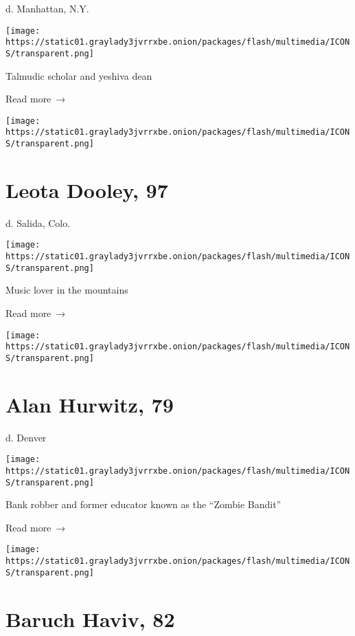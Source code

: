 d. Manhattan, N.Y.

\texttt{[image: https://static01.graylady3jvrrxbe.onion/packages/flash/multimedia/ICONS/transparent.png]}

Talmudic scholar and yeshiva dean

 Read more~→

\href{https://www.nytimes3xbfgragh.onion/2020/06/16/obituaries/leota-dooley-dead-coronavirus.html}{}

\texttt{[image: https://static01.graylady3jvrrxbe.onion/packages/flash/multimedia/ICONS/transparent.png]}

\hypertarget{leota-dooley-97}{%
\section{Leota Dooley, 97}\label{leota-dooley-97}}

d. Salida, Colo.

\texttt{[image: https://static01.graylady3jvrrxbe.onion/packages/flash/multimedia/ICONS/transparent.png]}

Music lover in the mountains

 Read more~→

\href{https://www.nytimes3xbfgragh.onion/2020/06/15/obituaries/alan-hurwitz-dead-coronavirus.html}{}

\texttt{[image: https://static01.graylady3jvrrxbe.onion/packages/flash/multimedia/ICONS/transparent.png]}

\hypertarget{alan-hurwitz-79}{%
\section{Alan Hurwitz, 79}\label{alan-hurwitz-79}}

d. Denver

\texttt{[image: https://static01.graylady3jvrrxbe.onion/packages/flash/multimedia/ICONS/transparent.png]}

Bank robber and former educator known as the ``Zombie Bandit''

 Read more~→

\href{https://www.nytimes3xbfgragh.onion/2020/06/15/nyregion/baruch-haviv-dead-coronavirus.html}{}

\texttt{[image: https://static01.graylady3jvrrxbe.onion/packages/flash/multimedia/ICONS/transparent.png]}

\hypertarget{baruch-haviv-82}{%
\section{Baruch Haviv, 82}\label{baruch-haviv-82}}

